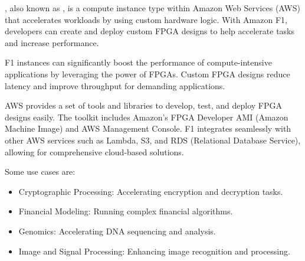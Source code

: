\begin{examplebox}[: Amazon F1]
    , also known as , is a compute instance type within Amazon Web Services (AWS) that accelerates workloads by using custom hardware logic. With Amazon F1, developers can create and deploy custom FPGA designs to help accelerate tasks and increase performance.

    \highspace
    F1 instances can significantly boost the performance of compute-intensive applications by leveraging the power of FPGAs. Custom FPGA designs reduce latency and improve throughput for demanding applications.

    \highspace
    AWS provides a set of tools and libraries to develop, test, and deploy FPGA designs easily. The toolkit includes Amazon's FPGA Developer AMI (Amazon Machine Image) and AWS Management Console. F1 integrates seamlessly with other AWS services such as Lambda, S3, and RDS (Relational Database Service), allowing for comprehensive cloud-based solutions.

    \highspace
    Some use cases are:
    \begin{itemize}
        \item Cryptographic Processing: Accelerating encryption and decryption tasks.
        \item Financial Modeling: Running complex financial algorithms.
        \item Genomics: Accelerating DNA sequencing and analysis.
        \item Image and Signal Processing: Enhancing image recognition and processing.
    \end{itemize}
\end{examplebox}
